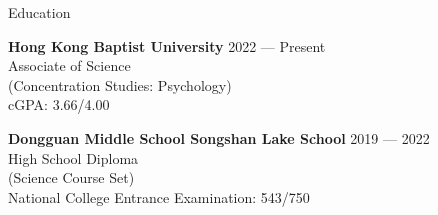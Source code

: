 \documentclass[
	11pt, %
]{resume} %
\begin{document}
\begin{rSection}{Education}

    \textbf{Hong Kong Baptist University} \hfill 2022 --- Present \\
    Associate of Science\\
    (Concentration Studies: Psychology)\\
    cGPA: 3.66/4.00

    \textbf{Dongguan Middle School Songshan Lake School} \hfill 2019 --- 2022 \\
    High School Diploma \\
    (Science Course Set)\\
    National College Entrance Examination: 543/750

\end{rSection}
\end{document}
